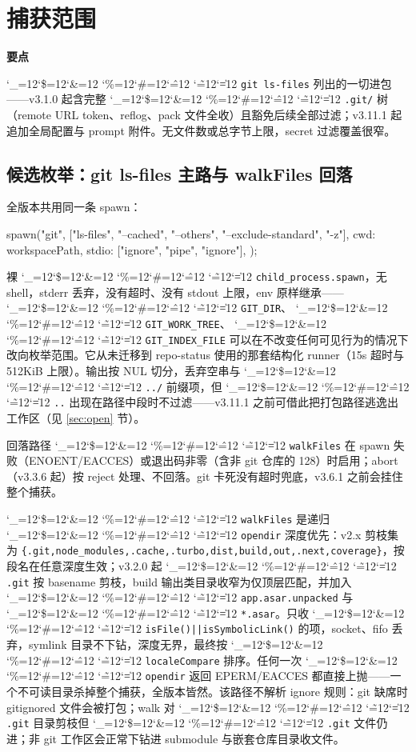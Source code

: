\documentclass[11pt,a4paper,fontset=none]{ctexart}
\newcommand{\cid}{%
  \begingroup
  \catcode`\_=12\relax \catcode`\$=12\relax \catcode`\&=12\relax
  \catcode`\%=12\relax \catcode`\#=12\relax \catcode`\^=12\relax
  \catcode`\~=12\relax \catcode`\|=12\relax
  \codeSpan}
\newcommand{\codeSpan}[1]{{\small\texttt{#1}}\endgroup}
\newenvironment{takeaway}{%
  \begin{mdframed}[backgroundcolor=black!4,linecolor=black!20,
    linewidth=0.5pt,skipabove=7pt,skipbelow=7pt,
    innertopmargin=5pt,innerbottommargin=5pt,
    innerleftmargin=8pt,innerrightmargin=8pt]
  \small\textbf{要点}\quad\ignorespaces
}{\end{mdframed}}
\begin{document}
\section{捕获范围}
\label{sec:scope}

\begin{takeaway}
\cid{git ls-files} 列出的一切进包——v3.1.0 起含完整 \cid{.git/} 树（remote URL token、reflog、pack 文件全收）且豁免后续全部过滤；v3.11.1 起追加全局配置与 prompt 附件。无文件数或总字节上限，secret 过滤覆盖很窄。
\end{takeaway}

\subsection{候选枚举：git ls-files 主路与 walkFiles 回落}

全版本共用同一条 spawn：

\begin{code}
spawn("git", ["ls-files", "--cached", "--others", "--exclude-standard", "-z"], {
    cwd: workspacePath,
    stdio: ["ignore", "pipe", "ignore"],
});
\end{code}

裸 \cid{child_process.spawn}，无 shell，stderr 丢弃，没有超时、没有 stdout 上限，env 原样继承——\cid{GIT_DIR}、\cid{GIT_WORK_TREE}、\cid{GIT_INDEX_FILE} 可以在不改变任何可见行为的情况下改向枚举范围。它从未迁移到 repo-status 使用的那套结构化 runner（15s 超时与 512KiB 上限）。输出按 NUL 切分，丢弃空串与 \cid{../} 前缀项，但 \cid{..} 出现在路径中段时不过滤——v3.11.1 之前可借此把打包路径逃逸出工作区（见 \ref{sec:open} 节）。

回落路径 \cid{walkFiles} 在 spawn 失败（ENOENT/EACCES）或退出码非零（含非 git 仓库的 128）时启用；abort（v3.3.6 起）按 reject 处理、不回落。git 卡死没有超时兜底，v3.6.1 之前会挂住整个捕获。

\cid{walkFiles} 是递归 \cid{opendir} 深度优先：v2.x 剪枝集为 \verb|{.git,node_modules,.cache,.turbo,|\allowbreak\verb|dist,build,out,.next,coverage}|，按段名在任意深度生效；v3.2.0 起 \cid{.git} 按 basename 剪枝，build 输出类目录收窄为仅顶层匹配，并加入 \cid{app.asar.unpacked} 与 \cid{*.asar}。只收 \cid{isFile()||isSymbolicLink()} 的项，socket、fifo 丢弃，symlink 目录不下钻，深度无界，最终按 \cid{localeCompare} 排序。任何一次 \cid{opendir} 返回 EPERM/EACCES 都直接上抛——一个不可读目录杀掉整个捕获，全版本皆然。该路径不解析 ignore 规则：git 缺席时 gitignored 文件会被打包；walk 对 \cid{.git} 目录剪枝但 \cid{.git} 文件仍进；非 git 工作区会正常下钻进 submodule 与嵌套仓库目录收文件。
\end{document}
